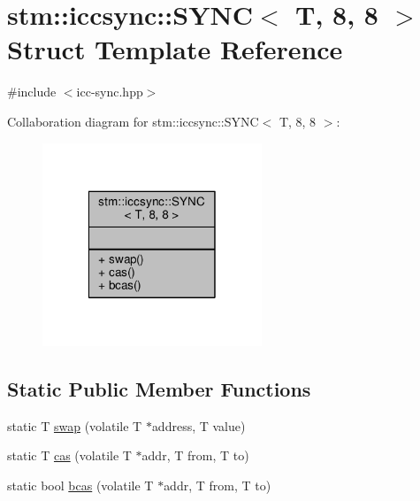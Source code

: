 \hypertarget{structstm_1_1iccsync_1_1SYNC_3_01T_00_018_00_018_01_4}{\section{stm\-:\-:iccsync\-:\-:S\-Y\-N\-C$<$ T, 8, 8 $>$ Struct Template Reference}
\label{structstm_1_1iccsync_1_1SYNC_3_01T_00_018_00_018_01_4}
}


{\ttfamily \#include $<$icc-\/sync.\-hpp$>$}



Collaboration diagram for stm\-:\-:iccsync\-:\-:S\-Y\-N\-C$<$ T, 8, 8 $>$\-:
\nopagebreak
\begin{figure}[H]
\begin{center}
\leavevmode
\includegraphics[width=186pt]{structstm_1_1iccsync_1_1SYNC_3_01T_00_018_00_018_01_4__coll__graph}
\end{center}
\end{figure}
\subsection*{Static Public Member Functions}
\begin{DoxyCompactItemize}
\item 
static T \hyperlink{structstm_1_1iccsync_1_1SYNC_3_01T_00_018_00_018_01_4_aae5886161121983f0112471db1e7c604}{swap} (volatile T $\ast$address, T value)
\item 
static T \hyperlink{structstm_1_1iccsync_1_1SYNC_3_01T_00_018_00_018_01_4_a76f8ae0b2cd5c1c800ff0d45a4e7a2b9}{cas} (volatile T $\ast$addr, T from, T to)
\item 
static bool \hyperlink{structstm_1_1iccsync_1_1SYNC_3_01T_00_018_00_018_01_4_a4736cc3d68c210085c02e6895fbdc424}{bcas} (volatile T $\ast$addr, T from, T to)
\end{DoxyCompactItemize}



